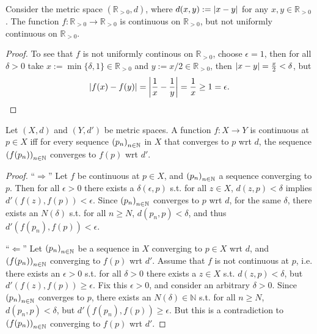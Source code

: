 \begin{exmp}
	Consider the metric space $(\mathbb R_{> 0}, d)$, where $d(x, y) := \abs{x - y}$ for any $x, y\in\mathbb R_{> 0}$. The function $f: \mathbb R_{>0} \to \mathbb R_{> 0}$ is continuous on $\mathbb R_{> 0}$, but not uniformly continuous on $\mathbb R_{> 0}$. 
\end{exmp}

\begin{proof}
	To see that $f$ is not uniformly continous on $\mathbb R_{> 0}$, choose $\epsilon = 1$, then for all $\delta > 0$ take $x := \min\{\delta, 1\}\in\mathbb R_{> 0}$ and $y := x/2\in\mathbb R_{> 0}$, then $\abs{x - y} = \frac{x}{2} < \delta$, but
	$$\abs{f(x) - f(y)} = \abs{\frac{1}{x} - \frac{1}{y}} = \frac{1}{x} \geq 1 = \epsilon.$$
\end{proof}

\begin{theorem}
	Let $(X, d)$ and $(Y, d')$ be metric spaces. A function $f: X\to Y$ is continuous at $p\in X$ iff for every sequence $\seq[p_n]$ in $X$ that converges to $p$ wrt $d$, the sequence $\seq[f(p_n)]$ converges to $f(p)$ wrt $d'$.
\end{theorem}

\begin{proof}
	\enquote{$\Longrightarrow$} Let $f$ be continuous at $p\in X$, and $\seq[p_n]$ a sequence converging to $p$. Then for all $\epsilon > 0$ there exists a $\delta(\epsilon, p)$ s.t. for all $z\in X$, $d(z, p) < \delta$ implies $d'(f(z), f(p)) < \epsilon$. Since $\seq[p_n]$ converges to $p$ wrt $d$, for the same $\delta$, there exists an $N(\delta)$ s.t. for all $n\geq N$, $d(p_n, p) < \delta$, and thus $d'(f(p_n), f(p)) < \epsilon$.
	
	\enquote{$\Longleftarrow$} Let $\seq[p_n]$ be a sequence in $X$ converging to $p\in X$ wrt $d$, and $\seq[f(p_n)]$ converging to $f(p)$ wrt $d'$. Assume that $f$ is not continuous at $p$, i.e. there exists an $\epsilon > 0$ s.t. for all $\delta > 0$ there exists a $z\in X$ s.t. $d(z, p) < \delta$, but $d'(f(z), f(p)) \geq \epsilon$. Fix this $\epsilon > 0$, and consider an arbitrary $\delta > 0$. Since $\seq[p_n]$ converges to $p$, there exists an $N(\delta)\in\mathbb N$ s.t. for all $n\geq N$, $d(p_n, p) < \delta$, but $d'(f(p_n), f(p)) \geq \epsilon$. But this is a contradiction to $\seq[f(p_n)]$ converging to $f(p)$ wrt $d'$.
\end{proof}

